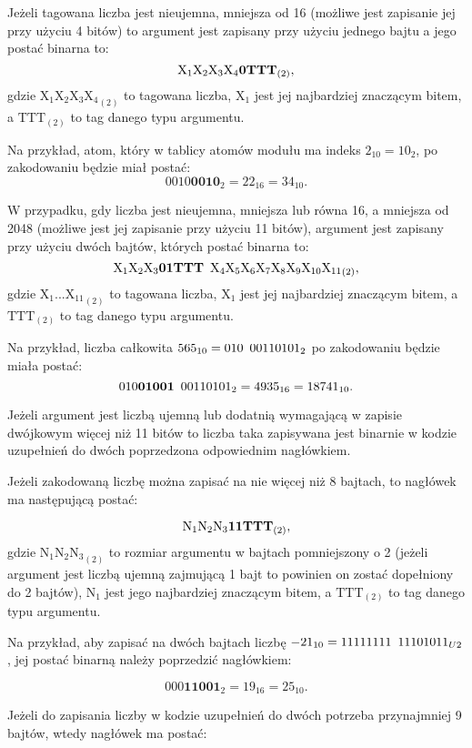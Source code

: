 Jeżeli tagowana liczba jest nieujemna, mniejsza od 16 (możliwe jest zapisanie jej przy użyciu 4 bitów) to argument jest zapisany przy użyciu jednego bajtu a jego postać binarna to:
$$ \text{X}_1\text{X}_2\text{X}_3\text{X}_4\mathbf{0}\text{\textbf{TTT}}_{(2)}, $$
gdzie ${\text{X}_1\text{X}_2\text{X}_3\text{X}_4}_{(2)}$ to tagowana liczba, $\text{X}_1$ jest jej najbardziej znaczącym bitem, a $\text{TTT}_{(2)}$ to tag danego typu argumentu.

Na przykład, atom, który w tablicy atomów modułu ma indeks $2_{10} = 10_{2}$, po zakodowaniu będzie miał postać:
$$0010\mathbf{0010}_{2} = 22_{16} = 34_{10}.$$

W przypadku, gdy liczba jest nieujemna, mniejsza lub równa 16, a mniejsza od 2048 (możliwe jest jej zapisanie przy użyciu 11 bitów), argument jest zapisany przy użyciu dwóch bajtów, których postać binarna to:
$$  {\text{X}_1\text{X}_2\text{X}_3\mathbf{01}\text{\textbf{TTT}} \enskip \text{X}_4\text{X}_5\text{X}_6\text{X}_7\text{X}_8\text{X}_9\text{X}_{10}\text{X}_{11}}_{(2)}, $$
gdzie ${\text{X}_1 ... \text{X}_{11}}_{(2)}$ to tagowana liczba, $\text{X}_1$ jest jej najbardziej znaczącym bitem, a ${\text{TTT}}_{(2)}$ to tag danego typu argumentu.

Na przykład, liczba całkowita $565_{10} = {010 \enskip 00110101}_{2}$ po zakodowaniu będzie miała postać:
$${010\mathbf{01001} \enskip 00110101}_{2} = 4935_{16} = 18741_{10}.$$

Jeżeli argument jest liczbą ujemną lub dodatnią wymagającą w zapisie dwójkowym więcej niż 11 bitów to liczba taka zapisywana jest binarnie w kodzie uzupełnień do dwóch poprzedzona odpowiednim nagłówkiem.

Jeżeli zakodowaną liczbę można zapisać na nie więcej niż 8 bajtach, to nagłówek ma następującą postać:

$$ {\text{N}_1\text{N}_2\text{N}_3 \mathbf{11} \text{\textbf{TTT}}}_{(2)}, $$
gdzie ${\text{N}_1\text{N}_2\text{N}_3}_{(2)}$ to rozmiar argumentu w bajtach pomniejszony o 2 (jeżeli argument jest liczbą ujemną zajmującą 1 bajt to powinien on zostać dopełniony do 2 bajtów), $\text{N}_1$ jest jego najbardziej znaczącym bitem, a $\text{TTT}_{(2)}$ to tag danego typu argumentu.

Na przykład, aby zapisać na dwóch bajtach liczbę $-21_{10} = {11111111 \enskip 11101011}_{U2}$, jej postać binarną należy poprzedzić nagłówkiem:

$${000\mathbf{11001}}_{2} = 19_{16} = 25_{10}.$$

Jeżeli do zapisania liczby w kodzie uzupełnień do dwóch potrzeba przynajmniej 9 bajtów, wtedy nagłówek ma postać:

